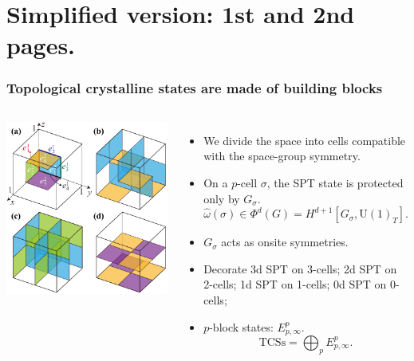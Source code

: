 \documentclass[xcolor=table, 10pt, aspectratio=43]{beamer}
\newcommand{\uone}{\mathrm U(1)}
\begin{document}
\section{Simplified version: 1st and 2nd pages.}
\begin{frame}
	\frametitle{Topological crystalline states are made of building blocks}
	\begin{columns}
		\begin{center}
			\includegraphics[width=\textwidth]{blocks}
		\end{center}
		\begin{itemize}
			\item We divide the space into cells compatible with the space-group symmetry.
			\item On a $p$-cell $\sigma$, the SPT state is protected only by $G_\sigma$.
			\[\hat\omega(\sigma)\in \Phi^d(G) = H^{d+1}[G_\sigma,\uone_T].\]
			\item $G_\sigma$ acts as onsite symmetries.
			\item Decorate 3d SPT on 3-cells; 2d SPT on 2-cells; 1d SPT on 1-cells; 0d SPT on 0-cells;
			\item $p$-block states: $E^p_{p,\infty}$.
			\[\text{TCSs} = \bigoplus_p E^p_{p,\infty}.\]
		\end{itemize}
	\end{columns}
\end{frame}
\end{document}

